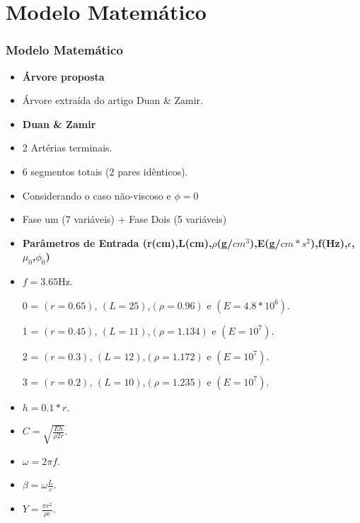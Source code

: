\documentclass[10pt]{beamer}
\theoremstyle{remark}
\theoremstyle{definition}
\begin{document}
\section{Modelo Matemático}
\begin{frame}[allowframebreaks]
\frametitle{Modelo Matemático}
	
	\begin{itemize}
		\item \textbf{Árvore proposta}
		\item Árvore extraída do artigo Duan \& Zamir.
		
	\end{itemize}

	\framebreak
	
	\begin{itemize}
		\item \textbf{Duan \& Zamir}
		\item 2 Artérias terminais.
		\item 6 segmentos totais (2 pares idênticos).
		\item Considerando o caso não-viscoso e  $\phi = 0$
		\item Fase um (7 variáveis) + Fase Dois (5 variáveis)
		
	\end{itemize}

\framebreak

\begin{itemize}
\item \textbf{Parâmetros de Entrada (r(cm),L(cm),$\rho$(g/$cm^3$),E(g/$cm*s^2$),f(Hz),$\epsilon$,$\mu_0$,$\phi_0$)}
\item $ f =3.65$Hz.
\item [0] = $(r = 0.65)$, $(L = 25)$,$(\rho = 0.96)$ e $(E = 4.8 * 10^6)$.
\item [1] = $(r = 0.45)$, $(L = 11)$,$(\rho = 1.134)$ e $(E = 10^7)$.
\item [2] = $(r = 0.3)$, $(L = 12)$,$(\rho = 1.172)$ e $(E = 10^7)$.
\item [3] = $(r = 0.2)$, $(L = 10)$,$(\rho = 1.235)$ e $(E = 10^7)$.

\end{itemize}

\framebreak

\begin{itemize}
	\item $ h = 0.1 * r $.
	\item $ C = \sqrt{\frac{Eh}{\rho 2 r}}$.
	\item $ \omega = 2 \pi f$.
	\item $ \beta = \omega \frac{L}{c}$.
	\item $ Y = \frac{\pi r^2}{\rho c}$.


\end{itemize}
\end{frame}
\end{document}
